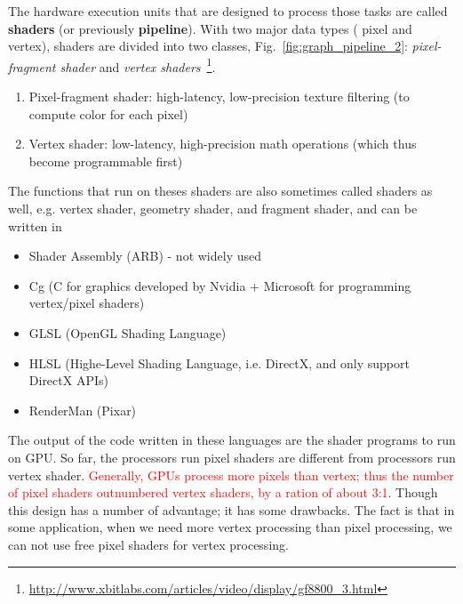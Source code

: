 The hardware execution units that
are designed to process those tasks are called {\bf shaders} (or previously {\bf
  pipeline}). With two major data types ( pixel and vertex), shaders
are divided into two classes, 
Fig.~\ref{fig:graph_pipeline_2}: {\it 
  pixel-fragment shader} and {\it vertex
  shaders}~\footnote{\url{http://www.xbitlabs.com/articles/video/display/gf8800_3.html}}. 

\begin{enumerate}
\item Pixel-fragment shader: high-latency, low-precision texture
  filtering (to compute color for each pixel)

\item Vertex shader: low-latency, high-precision math operations
  (which thus become programmable first)
\end{enumerate}

The functions that run on theses shaders are also sometimes called
shaders as well, e.g. vertex shader, geometry shader, and fragment
shader, and can be written in
\begin{itemize}
\item Shader Assembly (ARB) - not widely used
\item Cg (C for graphics developed by Nvidia + Microsoft for
  programming vertex/pixel shaders)
\item GLSL (OpenGL Shading Language)
\item HLSL (Highe-Level Shading Language, i.e. DirectX, and only
  support DirectX APIs)
\item RenderMan (Pixar)
\end{itemize}
The output of the code written in these languages are the shader
programs to run on GPU.  So far, the processors run pixel shaders are
different from processors run vertex shader.
\textcolor{red}{Generally, GPUs process more pixels than vertex; thus
  the number of pixel shaders outnumbered vertex shaders, by a ration
  of about 3:1}.
Though this design has a number of advantage; it has some
drawbacks. The fact is that in some application, when we need more
vertex processing than pixel processing, we can not use free pixel
shaders for vertex processing.

